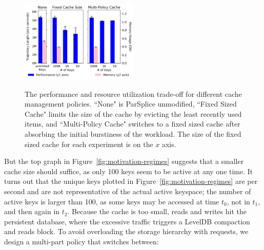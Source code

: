 


\begin{figure}[t]
\noindent\includegraphics[width=0.5\textwidth]{figures/methodology-tradeoff.png}\\
\caption{The performance and resource utilization trade-off for different cache
management policies. ``None" is ParSplice unmodified, ``Fixed Sized Cache"
limits the size of the cache by evicting the least recently used items, and
``Multi-Policy Cache" switches to a fixed sized cache after absorbing the
initial burstiness of the workload.  The size of the fixed sized cache for each
experiment is on the \(x\) axis.  \label{fig:methodology-tradeoff}}
\end{figure}
%
%

But the top graph in Figure~\ref{fig:motivation-regimes} suggests that a
smaller cache size should suffice, as only 100 keys seem to be active at any
one time.  It turns out that the unique keys plotted in
Figure~\ref{fig:motivation-regimes} are per second and are not representative
of the actual active keyspace; the number of active keys is larger than 100, as
some keys may be accessed at time \(t_0\), not in \(t_1\), and then again in
\(t_2\). Because the cache is too small, reads and writes hit the persistent
database, where the excessive traffic triggers a LevelDB compaction and reads
block.  To avoid overloading the storage hierarchy with requests, we design a
multi-part policy that switches between:

